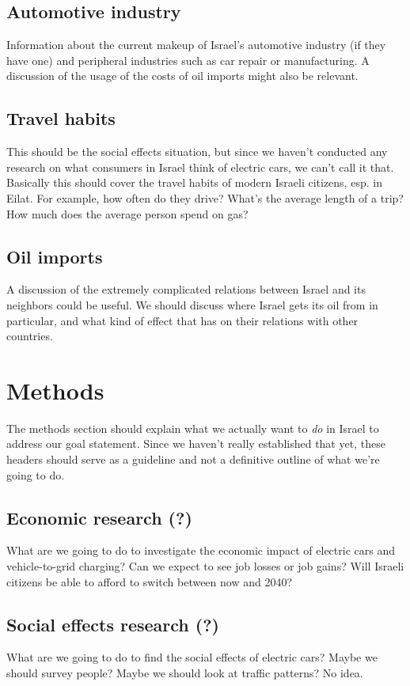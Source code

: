 \documentclass{article}
\begin{document}
\subsection{Automotive industry}
Information about the current makeup of Israel's automotive industry (if they have one) and peripheral industries such as car repair or manufacturing. A discussion of the usage of the costs of oil imports might also be relevant.

\subsection{Travel habits}
This should be the social effects situation, but since we haven't conducted any research on what consumers in Israel think of electric cars, we can't call it that. Basically this should cover the travel habits of modern Israeli citizens, esp. in Eilat. For example, how often do they drive? What's the average length of a trip? How much does the average person spend on gas?

\subsection{Oil imports}
A discussion of the extremely complicated relations between Israel and its neighbors could be useful. We should discuss where Israel gets its oil from in particular, and what kind of effect that has on their relations with other countries.

\newpage
\section{Methods}
The methods section should explain what we actually want to \textit{do} in Israel to address our goal statement. Since we haven't really established that yet, these headers should serve as a guideline and not a definitive outline of what we're going to do.

\subsection{Economic research (?)}
What are we going to do to investigate the economic impact of electric cars and vehicle-to-grid charging? Can we expect to see job losses or job gains? Will Israeli citizens be able to afford to switch between now and 2040?

\subsection{Social effects research (?)}
What are we going to do to find the social effects of electric cars? Maybe we should survey people? Maybe we should look at traffic patterns? No idea.
\end{document}
